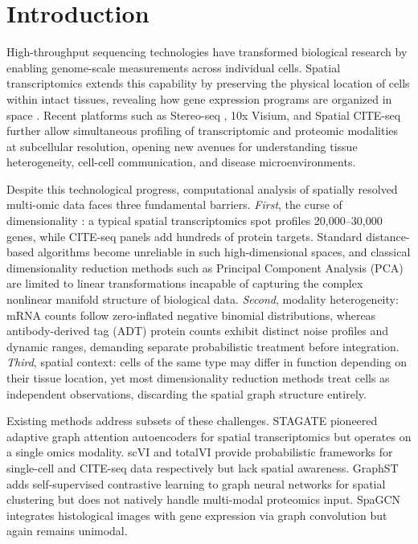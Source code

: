 \documentclass[conference]{IEEEtran}
\begin{document}
\section{Introduction}

High-throughput sequencing technologies have transformed biological research by enabling genome-scale measurements across individual cells. Spatial transcriptomics extends this capability by preserving the physical location of cells within intact tissues, revealing how gene expression programs are organized in space \cite{b9}. Recent platforms such as Stereo-seq \cite{b14}, 10x Visium, and Spatial CITE-seq \cite{b9} further allow simultaneous profiling of transcriptomic and proteomic modalities at subcellular resolution, opening new avenues for understanding tissue heterogeneity, cell-cell communication, and disease microenvironments.

Despite this technological progress, computational analysis of spatially resolved multi-omic data faces three fundamental barriers. \textit{First}, the curse of dimensionality \cite{b15}: a typical spatial transcriptomics spot profiles 20,000--30,000 genes, while CITE-seq panels add hundreds of protein targets. Standard distance-based algorithms become unreliable in such high-dimensional spaces, and classical dimensionality reduction methods such as Principal Component Analysis (PCA) are limited to linear transformations incapable of capturing the complex nonlinear manifold structure of biological data. \textit{Second}, modality heterogeneity: mRNA counts follow zero-inflated negative binomial distributions, whereas antibody-derived tag (ADT) protein counts exhibit distinct noise profiles and dynamic ranges, demanding separate probabilistic treatment before integration. \textit{Third}, spatial context: cells of the same type may differ in function depending on their tissue location, yet most dimensionality reduction methods treat cells as independent observations, discarding the spatial graph structure entirely.

Existing methods address subsets of these challenges. STAGATE \cite{b2} pioneered adaptive graph attention autoencoders for spatial transcriptomics but operates on a single omics modality. scVI \cite{b3} and totalVI \cite{b4} provide probabilistic frameworks for single-cell and CITE-seq data respectively but lack spatial awareness. GraphST \cite{b5} adds self-supervised contrastive learning to graph neural networks for spatial clustering but does not natively handle multi-modal proteomics input. SpaGCN \cite{b6} integrates histological images with gene expression via graph convolution but again remains unimodal.
\end{document}
